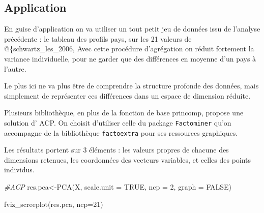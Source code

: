 \documentclass[
]{book}
\newenvironment{Shaded}{\begin{snugshade}}{\end{snugshade}}
\newcommand{\AttributeTok}[1]{\textcolor[rgb]{0.77,0.63,0.00}{#1}}
\newcommand{\CommentTok}[1]{\textcolor[rgb]{0.56,0.35,0.01}{\textit{#1}}}
\newcommand{\ConstantTok}[1]{\textcolor[rgb]{0.00,0.00,0.00}{#1}}
\newcommand{\DecValTok}[1]{\textcolor[rgb]{0.00,0.00,0.81}{#1}}
\newcommand{\FunctionTok}[1]{\textcolor[rgb]{0.00,0.00,0.00}{#1}}
\newcommand{\NormalTok}[1]{#1}
\newcommand{\OtherTok}[1]{\textcolor[rgb]{0.56,0.35,0.01}{#1}}
\newcommand{\SpecialCharTok}[1]{\textcolor[rgb]{0.00,0.00,0.00}{#1}}
\begin{document}
\hypertarget{application}{%
\subsection{Application}\label{application}}

En guise d'application on va utiliser un tout petit jeu de données issu de l'analyse précédente : le tableau des profils pays, sur les 21 valeurs de @\{schwartz\_les\_2006, Avec cette procédure d'agrégation on réduit fortement la variance individuelle, pour ne garder que des différences en moyenne d'un pays à l'autre.

Le plus ici ne va plus être de comprendre la structure profonde des données, mais simplement de représenter ces différences dans un espace de dimension réduite.

\begin{Shaded}
\end{Shaded}

Plusieurs bibliothèque, en plus de la fonction de base princomp, propose une solution d' ACP. On choisit d'utiliser celle du package \texttt{Factominer} qu'on accompagne de la bibliothèque \texttt{factoextra} pour ses ressources graphiques.

Les résultats portent sur 3 éléments : les valeurs propres de chacune des dimensions retenues, les coordonnées des vecteurs variables, et celles des points individus.

\begin{Shaded}
\begin{Highlighting}[]
\CommentTok{\#ACP}
\NormalTok{res.pca}\OtherTok{\textless{}{-}}\FunctionTok{PCA}\NormalTok{(X, }\AttributeTok{scale.unit =} \ConstantTok{TRUE}\NormalTok{, }\AttributeTok{ncp =} \DecValTok{2}\NormalTok{, }\AttributeTok{graph =} \ConstantTok{FALSE}\NormalTok{)}

\FunctionTok{fviz\_screeplot}\NormalTok{(res.pca, }\AttributeTok{ncp=}\DecValTok{21}\NormalTok{)}
\end{Highlighting}
\end{Shaded}
\end{document}
